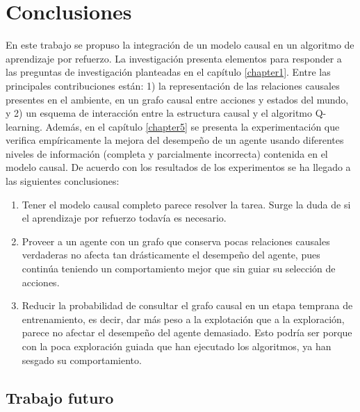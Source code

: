 \chapter{Conclusiones}\label{chapter6}

\graphicspath{{Chapter5/Figs/}}

En este trabajo se propuso la integración de un modelo causal en un
algoritmo de aprendizaje por refuerzo.
La investigación presenta
elementos para responder a las preguntas de investigación planteadas en el capítulo \ref{chapter1}. Entre las principales contribuciones están: 1) la representación de las relaciones causales presentes en el ambiente, en un grafo causal entre acciones y estados del mundo, y 2) un esquema de interacción entre la estructura causal y el algoritmo Q-learning. 
Además, en el capítulo \ref{chapter5} se presenta la experimentación que verifica empíricamente
    la mejora del desempeño de un agente usando diferentes niveles de información (completa y parcialmente incorrecta) contenida en el modelo causal. De acuerdo con los resultados de los experimentos 
    se ha llegado a las siguientes conclusiones:
    
\begin{enumerate}
    \item Tener el modelo causal completo parece resolver la tarea. Surge la 
    duda de si el aprendizaje por refuerzo todavía es necesario.
    \item Proveer a un agente con un grafo que conserva pocas relaciones
    causales verdaderas no afecta tan drásticamente el desempeño del agente, pues 
    continúa teniendo un comportamiento mejor que sin guiar su selección de acciones.
    \item Reducir la probabilidad de consultar el grafo causal en un etapa 
    temprana de entrenamiento, es decir, dar más peso a la explotación que a la exploración, parece no afectar el desempeño del agente demasiado. Esto podría
    ser porque con la poca exploración guiada que han ejecutado los algoritmos,
    ya han sesgado su comportamiento.
\end{enumerate}

\section{Trabajo futuro}

